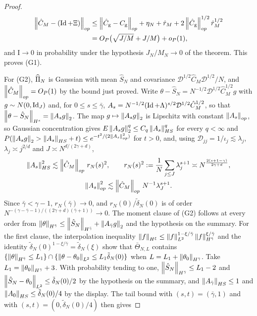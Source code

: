 \begin{proof}
\[
\begin{aligned}
\left\|\hat C_M-(\operatorname{Id}+\Xi)\right\|_{op}&\le\left\|\hat C_{\rm g}-C_{\rm g}\right\|_{op}+\eta_N+\hat r_M+2\left\|\hat C_{\rm g}\right\|^{1/2}_{op}\hat r_M^{1/2}\\
&=O_P\big(\sqrt{J/M}+J/M\big)+o_P(1) ,
\end{aligned}
\]
and $\mathrm I\to0$ in probability under the hypothesis $J_N/M_N\to0$ of the theorem. This proves (G1).

For (G2), $\widehat\Pi_N$ is Gaussian with mean $\hat S_N$ and covariance $\mathcal D^{1/2}\hat C_M\mathcal D^{1/2}/N$, and $\left\|\hat C_M\right\|_{op}=O_P(1)$ by the bound just proved. Write $\theta-\hat S_N=N^{-1/2}\mathcal D^{1/2}\hat C_M^{1/2}g$ with $g\sim N(0,\operatorname{Id}_J)$ and, for $0\le s\le\bar\gamma$, $A_s=N^{-1/2}(\operatorname{Id}+\Lambda)^{s/2}\mathcal D^{1/2}\hat C_M^{1/2}$, so that $\left\|\theta-\hat S_N\right\|_{H^s}=\left\|A_sg\right\|_2$. The map $g\mapsto\left\|A_sg\right\|_2$ is Lipschitz with constant $\left\|A_s\right\|_{op}$, so Gaussian concentration gives $E\left\|A_sg\right\|^q_2\le C_q\left\|A_s\right\|^q_{HS}$ for every $q<\infty$ and $P(\left\|A_sg\right\|_2>\left\|A_s\right\|_{HS}+t)\le e^{-t^2/(2\left\|A_s\right\|^2_{op})}$ for $t>0$, and, using $\mathcal D_{jj}=1/\iota_j\lesssim\lambda_j$, $\lambda_j\asymp j^{2/d}$ and $J\asymp N^{d/(2\gamma+d)}$,
\[
\begin{gathered}
\left\|A_s\right\|^2_{HS}\lesssim\left\|\hat C_M\right\|_{op}\,r_N(s)^2,\qquad r_N(s)^2:=\frac1N\sum_{j\le J}\lambda_j^{s+1}\asymp N^{\frac{2(s+1-\gamma)}{2\gamma+d}},\\
\left\|A_s\right\|^2_{op}\lesssim\left\|\hat C_M\right\|_{op}\,N^{-1}\lambda_J^{s+1} .
\end{gathered}
\]
Since $\bar\gamma<\gamma-1$, $r_N(\bar\gamma)\to0$, and $r_N(0)/\tilde\delta_N(0)$ is of order $N^{-(\gamma-\bar\gamma-1)/((2\gamma+d)(\bar\gamma+1))}\to0$. The moment clause of (G2) follows at every order from $\left\|\theta\right\|_{H^{\bar\gamma}}\le\left\|\hat S_N\right\|_{H^{\bar\gamma}}+\left\|A_{\bar\gamma}g\right\|_2$ and the hypothesis on the summary. For the first clause, the interpolation inequality $\left\|f\right\|_{H^\xi}\le\left\|f\right\|_{L^2}^{1-\xi/\bar\gamma}\left\|f\right\|_{H^{\bar\gamma}}^{\xi/\bar\gamma}$ and the identity $\tilde\delta_N(0)^{1-\xi/\bar\gamma}=\tilde\delta_N(\xi)$ show that $\bar\Theta_{N,L}$ contains $\{\left\|\theta\right\|_{H^{\bar\gamma}}\le L_1\}\cap\{\left\|\theta-\theta_0\right\|_{L^2}\le L_1\tilde\delta_N(0)\}$ when $L=L_1+\left\|\theta_0\right\|_{H^{\bar\gamma}}$. Take $L_1=\left\|\theta_0\right\|_{H^{\bar\gamma}}+3$. With probability tending to one, $\left\|\hat S_N\right\|_{H^{\bar\gamma}}\le L_1-2$ and $\left\|\hat S_N-\theta_0\right\|_{L^2}\le\tilde\delta_N(0)/2$ by the hypothesis on the summary, and $\left\|A_{\bar\gamma}\right\|_{HS}\le1$ and $\left\|A_0\right\|_{HS}\le\tilde\delta_N(0)/4$ by the display. The tail bound with $(s,t)=(\bar\gamma,1)$ and with $(s,t)=(0,\tilde\delta_N(0)/4)$ then gives

\end{proof}
